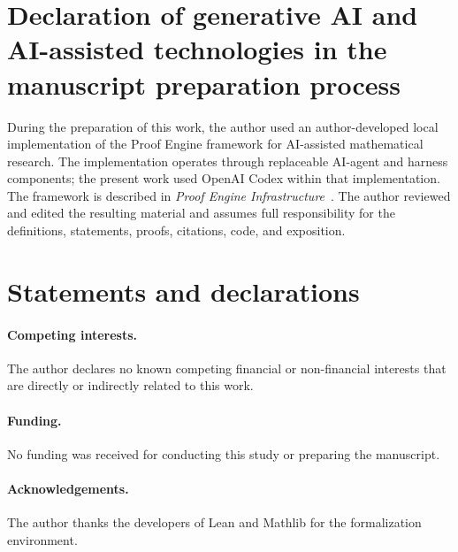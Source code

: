 \documentclass[11pt]{amsart}
\theoremstyle{definition}
\begin{document}
\section*{Declaration of generative AI and AI-assisted technologies in the
manuscript preparation process}

During the preparation of this work, the author used an author-developed local
implementation of the Proof Engine framework for AI-assisted mathematical
research.  The implementation operates through replaceable AI-agent and
harness components; the present work used OpenAI Codex within that
implementation.  The framework is described in \emph{Proof Engine
Infrastructure}~\cite{LiProofEngine2026}.  The author reviewed and edited the
resulting material and assumes full responsibility for the definitions,
statements, proofs, citations, code, and exposition.

\section*{Statements and declarations}

\paragraph{Competing interests.}
The author declares no known competing financial or non-financial interests
that are directly or indirectly related to this work.

\paragraph{Funding.}
No funding was received for conducting this study or preparing the manuscript.

\paragraph{Acknowledgements.}
The author thanks the developers of Lean and Mathlib for the formalization
environment.

\enlargethispage{8\baselineskip}


\end{document}
